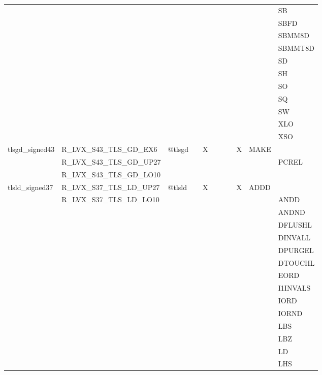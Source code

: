 {\begin{tabular}{|l|l|l|l|l|l|l|l|l|l|l|}
 & & & & & & & & & & \textsf{SB} \\
 & & & & & & & & & & \textsf{SBFD} \\
 & & & & & & & & & & \textsf{SBMM8D} \\
 & & & & & & & & & & \textsf{SBMMT8D} \\
 & & & & & & & & & & \textsf{SD} \\
 & & & & & & & & & & \textsf{SH} \\
 & & & & & & & & & & \textsf{SO} \\
 & & & & & & & & & & \textsf{SQ} \\
 & & & & & & & & & & \textsf{SW} \\
 & & & & & & & & & & \textsf{XLO} \\
 & & & & & & & & & & \textsf{XSO} \\
\hline
\textsf{tlsgd\_signed43} & \textsf{R\_LVX\_S43\_TLS\_GD\_EX6} & \textsf{@tlsgd} & \textsf{} & \textsf{X} & \textsf{} & \textsf{} & \textsf{} & \textsf{X} & \textsf{MAKE} \\
 & \textsf{R\_LVX\_S43\_TLS\_GD\_UP27} & & & & & & & & & \textsf{PCREL} \\
 & \textsf{R\_LVX\_S43\_TLS\_GD\_LO10} & & & & & & & & & \\
\hline
\textsf{tlsld\_signed37} & \textsf{R\_LVX\_S37\_TLS\_LD\_UP27} & \textsf{@tlsld} & \textsf{} & \textsf{X} & \textsf{} & \textsf{} & \textsf{} & \textsf{X} & \textsf{ADDD} \\
 & \textsf{R\_LVX\_S37\_TLS\_LD\_LO10} & & & & & & & & & \textsf{ANDD} \\
 & & & & & & & & & & \textsf{ANDND} \\
 & & & & & & & & & & \textsf{DFLUSHL} \\
 & & & & & & & & & & \textsf{DINVALL} \\
 & & & & & & & & & & \textsf{DPURGEL} \\
 & & & & & & & & & & \textsf{DTOUCHL} \\
 & & & & & & & & & & \textsf{EORD} \\
 & & & & & & & & & & \textsf{I1INVALS} \\
 & & & & & & & & & & \textsf{IORD} \\
 & & & & & & & & & & \textsf{IORND} \\
 & & & & & & & & & & \textsf{LBS} \\
 & & & & & & & & & & \textsf{LBZ} \\
 & & & & & & & & & & \textsf{LD} \\
 & & & & & & & & & & \textsf{LHS} \\

\end{tabular}}
